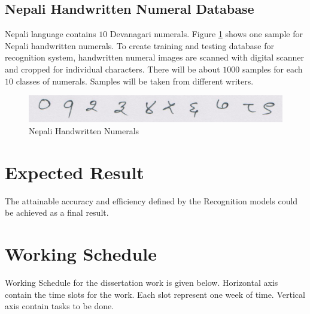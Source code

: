 \documentclass[12pt,a4paper,oneside]{article}
\numberwithin{equation}{section}
\numberwithin{algorithm}{section}
\begin{document}
\subsection{Nepali Handwritten Numeral Database}
\label{section_numeral_database}

Nepali language contains $10$ Devanagari numerals. Figure \ref{figure_one_two} shows one sample for Nepali handwritten numerals. To create training and testing database for recognition system, handwritten numeral images are scanned with digital scanner and cropped for individual characters. There will be about $1000$ samples for each $10$ classes of numerals. Samples will be taken from different writers.
\begin{figure}[hbtp]
\centering
\includegraphics[width=\linewidth]{figures/one_two}
\caption{Nepali Handwritten Numerals}
\label{figure_one_two}
\end{figure}

\section{Expected Result}\label{expected_result}

The attainable accuracy and efficiency defined by the Recognition models could be achieved as a final result.
\section{Working Schedule}\label{working_schedule}
Working Schedule for the dissertation work is given below. Horizontal axis contain the time slots for the work. Each slot represent one week  of time. Vertical axis contain tasks to be done.\par

	\centering
		


\end{document}
